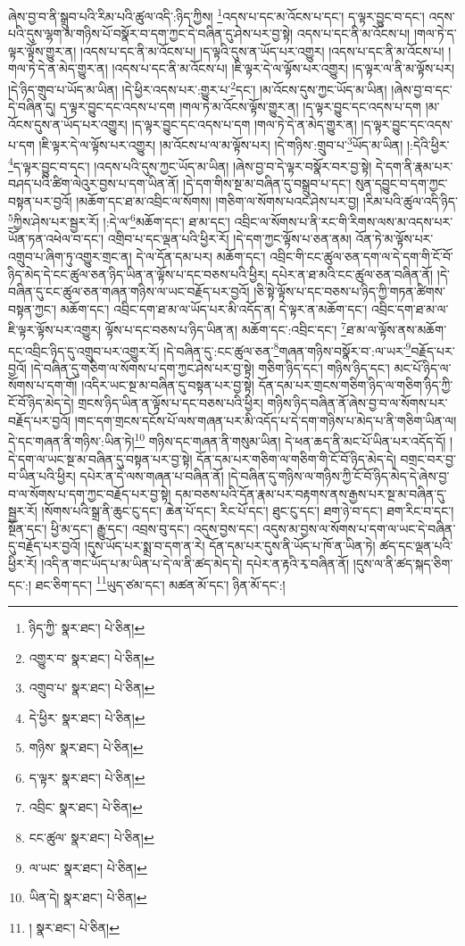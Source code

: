 ཞེས་བྱ་བ་ནི་སྒྲུབ་པའི་རིམ་པའི་ཚུལ་འདི་:ཉིད་ཀྱིས། \footnote{ཉིད་ཀྱི་  སྣར་ཐང་།  པེ་ཅིན། }འདས་པ་དང་མ་འོངས་པ་དང་། ད་ལྟར་བྱུང་བ་དང་། འདས་པའི་དུས་ལྷག་མ་གཉིས་པོ་བསྣོར་བ་དག་ཀྱང་དེ་བཞིན་དུ་ཤེས་པར་བྱ་སྟེ། འདས་པ་དང་ནི་མ་འོངས་པ། །གལ་ཏེ་ད་ལྟར་ལྟོས་གྱུར་ན། །འདས་པ་དང་ནི་མ་འོངས་པ། །ད་ལྟའི་དུས་ན་ཡོད་པར་འགྱུར། །འདས་པ་དང་ནི་མ་འོངས་པ། །གལ་ཏེ་དེ་ན་མེད་གྱུར་ན། །འདས་པ་དང་ནི་མ་འོངས་པ། །ཇི་ལྟར་དེ་ལ་ལྟོས་པར་འགྱུར། །ད་ལྟར་ལ་ནི་མ་ལྟོས་པར། །དེ་ཉིད་གྲུབ་པ་ཡོད་མ་ཡིན། །དེ་ཕྱིར་འདས་པར་:གྱུར་པ་\footnote{འགྱུར་བ་  སྣར་ཐང་།  པེ་ཅིན། }དང་། །མ་འོངས་དུས་ཀྱང་ཡོད་མ་ཡིན། །ཞེས་བྱ་བ་དང་དེ་བཞིན་དུ། ད་ལྟར་བྱུང་དང་འདས་པ་དག །གལ་ཏེ་མ་འོངས་ལྟོས་གྱུར་ན། །ད་ལྟར་བྱུང་དང་འདས་པ་དག །མ་འོངས་དུས་ན་ཡོད་པར་འགྱུར། །ད་ལྟར་བྱུང་དང་འདས་པ་དག །གལ་ཏེ་དེ་ན་མེད་གྱུར་ན། །ད་ལྟར་བྱུང་དང་འདས་པ་དག །ཇི་ལྟར་དེ་ལ་ལྟོས་པར་འགྱུར། །མ་འོངས་པ་ལ་མ་ལྟོས་པར། །དེ་གཉིས་:གྲུབ་པ་\footnote{འགྲུབ་པ་  སྣར་ཐང་།  པེ་ཅིན། }ཡོད་མ་ཡིན། །:དེའི་ཕྱིར་\footnote{དེ་ཕྱིར་  སྣར་ཐང་།  པེ་ཅིན། }ད་ལྟར་བྱུང་བ་དང་། །འདས་པའི་དུས་ཀྱང་ཡོད་མ་ཡིན། །ཞེས་བྱ་བ་དེ་ལྟར་བསྣོར་བར་བྱ་སྟེ། དེ་དག་ནི་རྣམ་པར་བཤད་པའི་ཚིག་ལེའུར་བྱས་པ་དག་ཡིན་ནོ། །དེ་དག་གིས་སྔ་མ་བཞིན་དུ་བསྒྲུབ་པ་དང་། སུན་དབྱུང་བ་དག་ཀྱང་བསྟན་པར་བྱའོ། །མཆོག་དང་ཐ་མ་འབྲིང་ལ་སོགས། །གཅིག་ལ་སོགས་པའང་ཤེས་པར་བྱ། །རིམ་པའི་ཚུལ་འདི་ཉིད་\footnote{གཉིས་  སྣར་ཐང་།  པེ་ཅིན། }ཀྱིས་ཤེས་པར་སྦྱར་རོ། །:དེ་ལ་\footnote{ད་ལྟར་  སྣར་ཐང་།  པེ་ཅིན། }མཆོག་དང་། ཐ་མ་དང་། འབྲིང་ལ་སོགས་པ་ནི་རང་གི་རིགས་ལས་མ་འདས་པར་ཡོན་ཏན་འཕེལ་བ་དང་། འགྲིབ་པ་དང་ལྡན་པའི་ཕྱིར་རོ། །དེ་དག་ཀྱང་ལྟོས་པ་ཅན་ནམ། འོན་ཏེ་མ་ལྟོས་པར་འགྲུབ་པ་ཞིག་ཏུ་འགྱུར་གྲང་ན། དེ་ལ་དོན་དམ་པར། མཆོག་དང་། འབྲིང་གི་ངང་ཚུལ་ཅན་དག་ལ་དེ་དག་གི་ངོ་བོ་ཉིད་མེད་དེ་ངང་ཚུལ་ཅན་ཉིད་ཡིན་ན་ལྟོས་པ་དང་བཅས་པའི་ཕྱིར། དཔེར་ན་ཐ་མའི་ངང་ཚུལ་ཅན་བཞིན་ནོ། །དེ་བཞིན་དུ་ངང་ཚུལ་ཅན་གཞན་གཉིས་ལ་ཡང་བརྗོད་པར་བྱའོ། །ཅི་སྟེ་ལྟོས་པ་དང་བཅས་པ་ཉིད་ཀྱི་གཏན་ཚིགས་བསྟན་ཀྱང་། མཆོག་དང་། འབྲིང་དག་ཐ་མ་ལ་ཡོད་པར་མི་འདོད་ན། དེ་ལྟར་ན་མཆོག་དང་། འབྲིང་དག་ཐ་མ་ལ་ཇི་ལྟར་ལྟོས་པར་འགྱུར། ལྟོས་པ་དང་བཅས་པ་ཉིད་ཡིན་ན། མཆོག་དང་:འབྲིང་དང་། \footnote{འབྲིང་  སྣར་ཐང་།  པེ་ཅིན། }ཐ་མ་ལ་ལྟོས་ནས་མཆོག་དང་འབྲིང་ཉིད་དུ་འགྲུབ་པར་འགྱུར་རོ། །དེ་བཞིན་དུ་:ངང་ཚུལ་ཅན་\footnote{ངང་ཚུལ་  སྣར་ཐང་།  པེ་ཅིན། }གཞན་གཉིས་བསྣོར་བ་:ལ་ཡར་\footnote{ལ་ཡང་  སྣར་ཐང་།  པེ་ཅིན། }བརྗོད་པར་བྱའོ། །དེ་བཞིན་དུ་གཅིག་ལ་སོགས་པ་དག་ཀྱང་ཤེས་པར་བྱ་སྟེ། གཅིག་ཉིད་དང་། གཉིས་ཉིད་དང་། མང་པོ་ཉིད་ལ་སོགས་པ་དག་གོ། །འདིར་ཡང་སྔ་མ་བཞིན་དུ་བསྟན་པར་བྱ་སྟེ། དོན་དམ་པར་གྲངས་གཅིག་ཉིད་ལ་གཅིག་ཉིད་ཀྱི་ངོ་བོ་ཉིད་མེད་དེ། གྲངས་ཉིད་ཡིན་ན་ལྟོས་པ་དང་བཅས་པའི་ཕྱིར། གཉིས་ཉིད་བཞིན་ནོ་ཞེས་བྱ་བ་ལ་སོགས་པར་བརྗོད་པར་བྱའོ། །གང་དག་གྲངས་དངོས་པོ་ལས་གཞན་པར་མི་འདོད་པ་དེ་དག་གཉིས་པ་མེད་པ་ནི་གཅིག་ཡིན་ལ། དེ་དང་གཞན་ནི་གཉིས་:ཡིན་ཏེ།\footnote{ཡིན་དེ།  སྣར་ཐང་།  པེ་ཅིན། } གཉིས་དང་གཞན་ནི་གསུམ་ཡིན། དེ་ཕན་ཆད་ནི་མང་པོ་ཡིན་པར་འདོད་དོ། །དེ་དག་ལ་ཡང་སྔ་མ་བཞིན་དུ་བསྟན་པར་བྱ་སྟེ། དོན་དམ་པར་གཅིག་ལ་གཅིག་གི་ངོ་བོ་ཉིད་མེད་དེ། བགྲང་བར་བྱ་བ་ཡིན་པའི་ཕྱིར། དཔེར་ན་དེ་ལས་གཞན་པ་བཞིན་ནོ། །དེ་བཞིན་དུ་གཉིས་ལ་གཉིས་ཀྱི་ངོ་བོ་ཉིད་མེད་དེ་ཞེས་བྱ་བ་ལ་སོགས་པ་དག་ཀྱང་བརྗོད་པར་བྱ་སྟེ། དམ་བཅས་པའི་དོན་རྣམ་པར་བརྟགས་ནས་རྒྱས་པར་སྔ་མ་བཞིན་དུ་སྦྱར་རོ། །སོགས་པའི་སྒྲ་ནི་ཆུང་ངུ་དང་། ཆེན་པོ་དང་། རིང་པོ་དང་། ཐུང་ངུ་དང་། ཐག་ཉེ་བ་དང་། ཐག་རིང་བ་དང་། སྔོན་དང་། ཕྱི་མ་དང་། རྒྱུ་དང་། འབྲས་བུ་དང་། འདུས་བྱས་དང་། འདུས་མ་བྱས་ལ་སོགས་པ་དག་ལ་ཡང་དེ་བཞིན་དུ་བརྗོད་པར་བྱའོ། །དུས་ཡོད་པར་སྨྲ་བ་དག་ན་རེ། དོན་དམ་པར་དུས་ནི་ཡོད་པ་ཁོ་ན་ཡིན་ཏེ། ཚད་དང་ལྡན་པའི་ཕྱིར་རོ། །འདི་ན་གང་ཡོད་པ་མ་ཡིན་པ་དེ་ལ་ནི་ཚད་མེད་དེ། དཔེར་ན་རྟའི་རྭ་བཞིན་ནོ། །དུས་ལ་ནི་ཚད་སྐད་ཅིག་དང་:། ཐང་ཅིག་དང་། \footnote{།    སྣར་ཐང་།  པེ་ཅིན། }ཡུད་ཙམ་དང་། མཚན་མོ་དང་། ཉིན་མོ་དང་:། 